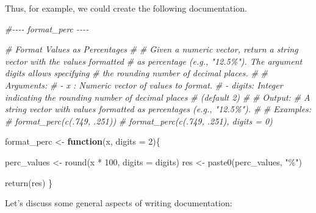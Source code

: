 \documentclass[
  11pt,
]{book}
\newenvironment{Shaded}{\begin{snugshade}}{\end{snugshade}}
\newcommand{\AttributeTok}[1]{\textcolor[rgb]{0.77,0.63,0.00}{#1}}
\newcommand{\CommentTok}[1]{\textcolor[rgb]{0.56,0.35,0.01}{\textit{#1}}}
\newcommand{\ControlFlowTok}[1]{\textcolor[rgb]{0.13,0.29,0.53}{\textbf{#1}}}
\newcommand{\DecValTok}[1]{\textcolor[rgb]{0.00,0.00,0.81}{#1}}
\newcommand{\FunctionTok}[1]{\textcolor[rgb]{0.00,0.00,0.00}{#1}}
\newcommand{\NormalTok}[1]{#1}
\newcommand{\OtherTok}[1]{\textcolor[rgb]{0.56,0.35,0.01}{#1}}
\newcommand{\SpecialCharTok}[1]{\textcolor[rgb]{0.00,0.00,0.00}{#1}}
\newcommand{\StringTok}[1]{\textcolor[rgb]{0.31,0.60,0.02}{#1}}
\begin{document}
Thus, for example, we could create the following documentation.

\begin{Shaded}
\begin{Highlighting}[]
\CommentTok{\#{-}{-}{-}{-}    format\_perc    {-}{-}{-}{-}}

\CommentTok{\# Format Values as Percentages}
\CommentTok{\#}
\CommentTok{\# Given a numeric vector, return a string vector with the values formatted}
\CommentTok{\# as percentage (e.g., "12.5\%"). The argument \textasciigrave{}digits\textasciigrave{} allows specifying}
\CommentTok{\# the rounding number of decimal places.}
\CommentTok{\#}
\CommentTok{\# Arguments:}
\CommentTok{\# {-} x : Numeric vector of values to format.}
\CommentTok{\# {-} digits: Integer indicating the rounding number of decimal places }
\CommentTok{\#           (default 2)}
\CommentTok{\#}
\CommentTok{\# Output:}
\CommentTok{\# A string vector with values formatted as percentages (e.g., "12.5\%").}
\CommentTok{\#}
\CommentTok{\# Examples:}
\CommentTok{\# format\_perc(c(.749, .251))}
\CommentTok{\# format\_perc(c(.749, .251), digits = 0)}

\NormalTok{format\_perc }\OtherTok{\textless{}{-}} \ControlFlowTok{function}\NormalTok{(x, }\AttributeTok{digits =} \DecValTok{2}\NormalTok{)\{}
      
\NormalTok{  perc\_values }\OtherTok{\textless{}{-}} \FunctionTok{round}\NormalTok{(x }\SpecialCharTok{*} \DecValTok{100}\NormalTok{, }\AttributeTok{digits =}\NormalTok{ digits)}
\NormalTok{  res }\OtherTok{\textless{}{-}} \FunctionTok{paste0}\NormalTok{(perc\_values, }\StringTok{"\%"}\NormalTok{)}
  
  \FunctionTok{return}\NormalTok{(res)}
\NormalTok{\}}
\end{Highlighting}
\end{Shaded}

Let's discuss some general aspects of writing documentation:
\end{document}
